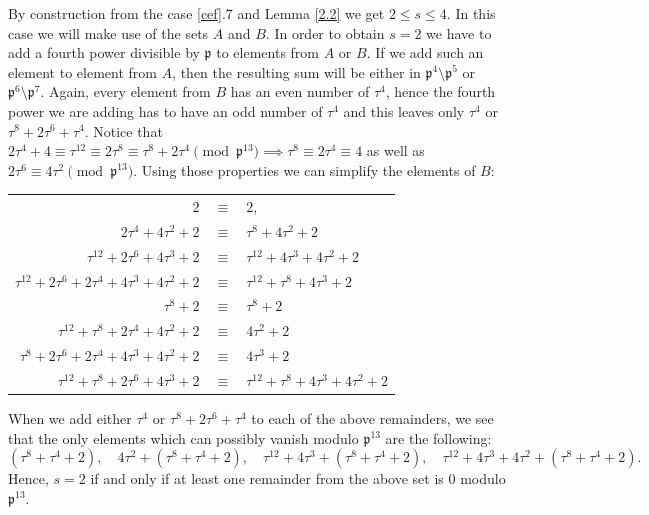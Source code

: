 \documentclass[12pt]{article}
\theoremstyle{remark}
\newcommand{\p}{\mathfrak{p}}
\begin{document}
By construction from the case \ref{cef}.7 and Lemma \ref{2.2} we get $2 \leq s \leq 4$. In this case we will make use of the sets $A$ and $B$. In order to obtain $s=2$ we have to add a fourth power divisible by $\p$ to elements from $A$ or $B$. If we add such an element to element from $A$, then the resulting sum will be either in $\p^4\setminus \p^5$ or $\p^6\setminus \p^7$. Again, every element from $B$ has an even number of $\tau^4$, hence the fourth power we are adding has to have an odd number of $\tau^4$ and this leaves only $\tau^4$ or $\tau^8+2\tau^6+\tau^4$. Notice that $2\tau^4+4 \equiv \tau^{12} \equiv 2\tau^8 \equiv \tau^8+2\tau^4 \pmod{\mathfrak{p}^{13}} \implies \tau^8 \equiv 2\tau^4 \equiv 4$ as well as $2\tau^6 \equiv 4\tau^2 \pmod{\mathfrak{p}^{13}}$. Using those properties we can simplify the elements of $B$:  
\begin{center}
\begin{tabular}{r c l}
$2$ & $\equiv$ & $ 2$,\\
$2\tau^4+4\tau^2+2$ & $\equiv$ & $ \tau^8+4\tau^2+2$\\
$\tau^{12} + 2\tau^6 + 4\tau^3 + 2$ & $\equiv$ & $ \tau^{12}+4\tau^3+4\tau^2+2 $\\
$\tau^{12}+ 2\tau^6 + 2\tau^4 + 4\tau^3 + 4\tau^2 + 2$ & $\equiv$ & $ \tau^{12}+\tau^8+4\tau^3+2 $ \qquad \qquad \qquad \ \\
$\tau^8 + 2$ & $\equiv$ & $ \tau^8+2 $\\
$\tau^{12}+\tau^8+2\tau^4+4\tau^2+2$ & $\equiv$ & $ 4\tau^2+2$\\
$\tau^8+2\tau^6+2\tau^4+4\tau^3+4\tau^2+2$ & $\equiv$ & $ 4\tau^3+2$\\
$\tau^{12}+\tau^8+2\tau^6+4\tau^3+2$ & $\equiv$ & $ \tau^{12}+\tau^8+4\tau^3+4\tau^2+2$
\end{tabular}
\end{center}
When we add either $\tau^4$ or $\tau^8+2\tau^6+\tau^4$ to each of the above remainders, we see that the only elements which can possibly vanish modulo $\mathfrak{p}^{13}$ are the following:
\[(\tau^8+\tau^4+2), \quad 4\tau^2+ (\tau^8+\tau^4+2), \quad \tau^{12}+4\tau^3+(\tau^8+\tau^4+2), \quad \tau^{12}+4\tau^3+4\tau^2 + (\tau^8+\tau^4+2).\]
Hence,  $s=2$ if and only if at least one remainder from the above set is 0 modulo $\mathfrak{p}^{13}$. 
\end{document}
